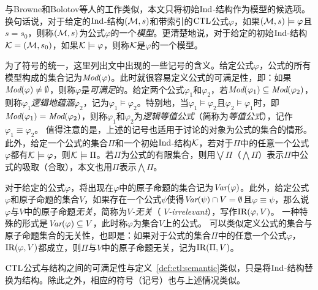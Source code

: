 与Browne和Bolotov等人的工作类似，本文只将初始$\textrm{Ind}$-结构作为模型的候选项\cite{browne1988characterizing,DBLP:journals/jetai/BolotovF99}。换句话说，对于给定的$\textrm{Ind}$-结构$({\cal M},s)$和带索引的$\textrm{CTL}$公式$\varphi$，如果$({\cal M},s)\models \varphi$且$s = s_0$，则称$({\cal M},s)$为公式$\varphi$的一个\emph{模型}。更清楚地说，对于给定的初始$\textrm{Ind}$-结构${\cal K}=({\cal M},s_0)$，如果${\cal K} \models \varphi$，则称$\cal K$是$\varphi$的一个模型。


为了符号的统一，这里列出文中出现的一些记号的含义。给定公式$\varphi$，公式的所有模型构成的集合记为$\textit{Mod}(\varphi)$。此时就很容易定义公式的可满足性，即：如果$\textit{Mod}(\varphi)\not = \emptyset$，则称$\varphi$是\emph{可满足}的。给定两个公式$\varphi_1$和$\varphi_2$，若$\textit{Mod}(\varphi_1)\subseteq \textit{Mod}(\varphi_2)$，则称$\varphi_1$\emph{逻辑地蕴涵}$\varphi_2$，记为$\varphi_1\models \varphi_2$。特别地，当$\varphi_1\models \varphi_2$且$\varphi_2\models \varphi_1$时，即$\textit{Mod}(\varphi_1)= \textit{Mod}(\varphi_2)$，则称$\varphi_1$和$\varphi_2$为\emph{逻辑等值公式}（简称为\emph{等值公式}），记作$\varphi_1 \equiv \varphi_2$。
值得注意的是，上述的记号也适用于讨论的对象为公式的集合的情形。
此外，给定一个公式的集合$\Pi$和一个初始$\textrm{Ind}$-结构$\cal K$，若对于$\Pi$中的任意一个公式$\varphi$都有${\cal K} \models \varphi$，则${\cal K} \models \Pi$。若$\Pi$为公式的有限集合，则用$\bigvee \Pi$（$\bigwedge \Pi$）表示$\Pi$中公式的吸取（合取），本文也用$\Pi$表示$\bigwedge \Pi$。

对于给定的公式$\varphi$，将出现在$\varphi$中的原子命题的集合记为$\textit{Var}(\varphi)$。此外，给定公式$\varphi$和原子命题的集合$V$，如果存在一个公式$\psi$使得$\textit{Var}(\psi) \cap V = \emptyset$且$\varphi \equiv \psi$，那么说$\varphi$与$V$中的原子命题\emph{无关}，简称为\emph{$V$-无关}（ \emph{$V$-irrelevant}），写作$\textrm{IR}(\varphi,V)$。
一种特殊的形式是$\textit{Var}(\varphi) \subseteq V$，此时称$\varphi$为集合$V$上的公式。
可以类似定义公式的集合与原子命题集合的无关性，也即是：如果对于公式的集合$\Pi$中的任意一个公式$\varphi$，$\textrm{IR}(\varphi,V)$都成立，则$\Pi$与$V$中的原子命题无关，记为$\textrm{IR}(\Pi,V)$。

$\textrm{CTL}$公式与结构之间的可满足性与定义~\ref{def:ctl:semantic}类似，只是将$\textrm{Ind}$-结构替换为结构。除此之外，相应的符号（记号）也与上述情况类似。

